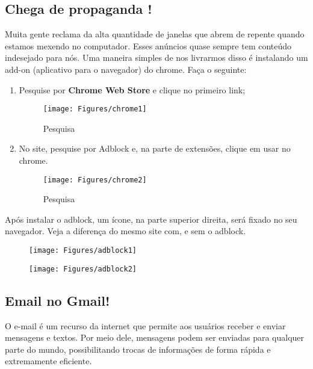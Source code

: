 \documentclass[hidelinks,12pt]{article}
\begin{document}
			\subsection{Chega de propaganda !}
			
			Muita gente reclama da alta quantidade de janelas que abrem de repente quando estamos mexendo no computador. Esses anúncios quase sempre tem conteúdo indesejado para nós. Uma maneira simples de nos livrarmos disso é instalando um add-on (aplicativo para o navegador) do chrome. Faça o seguinte:
			
			\begin{enumerate}
				\item Pesquise por \textbf{Chrome Web Store} e clique no primeiro link;
				
				\begin{figure}[!h]
					\centering
					\texttt{[image: Figures/chrome1]}
					\label{fig:chrome1}
					\caption{Pesquisa}
				\end{figure}
				
				\item No site, pesquise por Adblock e, na parte de extensões, clique em usar no chrome.
				
				\begin{figure}[!h]
					\centering
					\texttt{[image: Figures/chrome2]}
					\label{fig:chrome2}
					\caption{Pesquisa}
				\end{figure}
			
			\end{enumerate}
			
			Após instalar o adblock, um ícone, na parte superior direita, será fixado no seu navegador. Veja a diferença do mesmo site com, e sem o adblock.

			\begin{figure}[!htbp]
				\centering
				\begin{minipage}[b]{0.5\textwidth}
					\texttt{[image: Figures/adblock1]}\\
					
				\end{minipage}
				\hfill
				\begin{minipage}[b]{0.5\textwidth}
					\texttt{[image: Figures/adblock2]}
					
				\end{minipage}
			\end{figure}

			
			\newpage
		\subsection{Email no Gmail!}
			 O e-mail é um recurso da internet que permite aos usuários receber e enviar mensagens e textos. Por meio dele, mensagens podem ser enviadas para qualquer parte do mundo, possibilitando trocas de informações de forma rápida e extremamente eficiente. 
\end{document}
